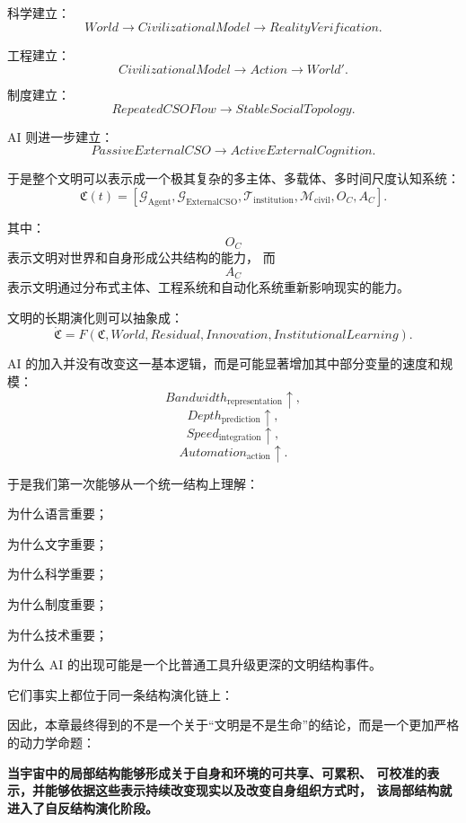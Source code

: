 科学建立：
\[
World
\rightarrow
CivilizationalModel
\rightarrow
RealityVerification.
\]

工程建立：
\[
CivilizationalModel
\rightarrow
Action
\rightarrow
World'.
\]

制度建立：
\[
RepeatedCSOFlow
\rightarrow
StableSocialTopology.
\]

AI 则进一步建立：
\[
PassiveExternalCSO
\rightarrow
ActiveExternalCognition.
\]

于是整个文明可以表示成一个极其复杂的多主体、多载体、多时间尺度认知系统：
\[
\mathfrak C(t)
=
\left[
\mathcal G_{\mathrm{Agent}},
\mathcal G_{\mathrm{ExternalCSO}},
\mathcal T_{\mathrm{institution}},
\mathcal M_{\mathrm{civil}},
O_C,
A_C
\right].
\]

其中：
\[
O_C
\]
表示文明对世界和自身形成公共结构的能力，
而
\[
A_C
\]
表示文明通过分布式主体、工程系统和自动化系统重新影响现实的能力。

文明的长期演化则可以抽象成：
\[
\boxed{
\dot{\mathfrak C}
=
F(
\mathfrak C,
World,
Residual,
Innovation,
InstitutionalLearning
).
}
\]

AI 的加入并没有改变这一基本逻辑，而是可能显著增加其中部分变量的速度和规模：
\[
Bandwidth_{\mathrm{representation}}\uparrow,
\]
\[
Depth_{\mathrm{prediction}}\uparrow,
\]
\[
Speed_{\mathrm{integration}}\uparrow,
\]
\[
Automation_{\mathrm{action}}\uparrow.
\]

于是我们第一次能够从一个统一结构上理解：

为什么语言重要；

为什么文字重要；

为什么科学重要；

为什么制度重要；

为什么技术重要；

为什么 AI 的出现可能是一个比普通工具升级更深的文明结构事件。

它们事实上都位于同一条结构演化链上：

\begin{statementbox}
\centering
{}
\end{statementbox}

因此，本章最终得到的不是一个关于“文明是不是生命”的结论，而是一个更加严格的动力学命题：

\begin{proposition*}
\bfseries
当宇宙中的局部结构能够形成关于自身和环境的可共享、可累积、
可校准的表示，并能够依据这些表示持续改变现实以及改变自身组织方式时，
该局部结构就进入了自反结构演化阶段。
\end{proposition*}


